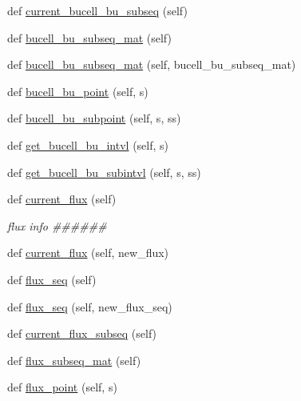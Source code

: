 \begin{DoxyCompactItemize}
\item 
def \hyperlink{classonix_1_1sequence_1_1Sequence_afb32f70bb90d9039d9c6db255d6cb758}{current\+\_\+bucell\+\_\+bu\+\_\+subseq} (self)
\item 
def \hyperlink{classonix_1_1sequence_1_1Sequence_a263ba1d4cdb10ad54d6dfeff4f60f875}{bucell\+\_\+bu\+\_\+subseq\+\_\+mat} (self)
\item 
def \hyperlink{classonix_1_1sequence_1_1Sequence_a21ed9134f910c51c49e264e4a53db745}{bucell\+\_\+bu\+\_\+subseq\+\_\+mat} (self, bucell\+\_\+bu\+\_\+subseq\+\_\+mat)
\item 
def \hyperlink{classonix_1_1sequence_1_1Sequence_a1b3e9b5c744a2d66741a194bcacc4bba}{bucell\+\_\+bu\+\_\+point} (self, s)
\item 
def \hyperlink{classonix_1_1sequence_1_1Sequence_a17975d73f0999524afcfeae5a1fbb3ad}{bucell\+\_\+bu\+\_\+subpoint} (self, s, ss)
\item 
def \hyperlink{classonix_1_1sequence_1_1Sequence_a63956192d96130aa044ae707fbb03b40}{get\+\_\+bucell\+\_\+bu\+\_\+intvl} (self, s)
\item 
def \hyperlink{classonix_1_1sequence_1_1Sequence_a6732fe610abc6a483d990857c9be7e92}{get\+\_\+bucell\+\_\+bu\+\_\+subintvl} (self, s, ss)
\item 
def \hyperlink{classonix_1_1sequence_1_1Sequence_aab433adc6fcbeb9147dead2512d435a1}{current\+\_\+flux} (self)
\begin{DoxyCompactList}\small\item\em flux info \#\#\#\#\#\# \end{DoxyCompactList}\item 
def \hyperlink{classonix_1_1sequence_1_1Sequence_a28dc898856ce65054f85f4f7fea580d4}{current\+\_\+flux} (self, new\+\_\+flux)
\item 
def \hyperlink{classonix_1_1sequence_1_1Sequence_a6b1fa0e16ef859ac035ac6b1a77944ad}{flux\+\_\+seq} (self)
\item 
def \hyperlink{classonix_1_1sequence_1_1Sequence_aad160c741c397ef1dfe8ed927e8f199f}{flux\+\_\+seq} (self, new\+\_\+flux\+\_\+seq)
\item 
def \hyperlink{classonix_1_1sequence_1_1Sequence_aaf71d720b5530b4b2172891b93f45829}{current\+\_\+flux\+\_\+subseq} (self)
\item 
def \hyperlink{classonix_1_1sequence_1_1Sequence_a7bdc99d34fa79fec10d979a972138ffa}{flux\+\_\+subseq\+\_\+mat} (self)
\item 
def \hyperlink{classonix_1_1sequence_1_1Sequence_a4e049d7c4dc532a042da7c4d6297566e}{flux\+\_\+point} (self, s)

\end{DoxyCompactItemize}
